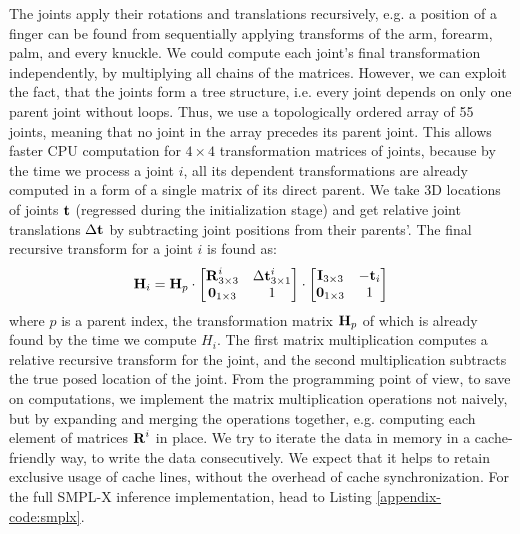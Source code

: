 The joints apply their rotations and translations recursively, e.g. a position of a finger can be found from sequentially applying transforms of the arm, forearm, palm, and every knuckle. We could compute each joint's final transformation independently, by multiplying all chains of the matrices. However, we can exploit the fact, that the joints form a tree structure, i.e. every joint depends on only one parent joint without loops. Thus, we use a topologically ordered array of 55 joints, meaning that no joint in the array precedes its parent joint. This allows faster CPU computation for $4\times4$ transformation matrices of joints, because by the time we process a joint $i$, all its dependent transformations are already computed in a form of a single matrix of its direct parent. We take 3D locations of joints $\bm{\mathrm{t}}$ (regressed during the initialization stage) and get relative joint translations $\Delta\bm{\mathrm{t}}$ by subtracting joint positions from their parents'. The final recursive transform  for a joint $i$ is found as:
\begin{equation}
	\bm{\mathrm{H}}_i = 
	\bm{\mathrm{H}}_p
	\cdot
	\begin{bmatrix} 
		\bm{\mathrm{R}}^i_{3 \times 3} & \Delta\bm{\mathrm{t}}^i_{3 \times 1} \\
		\bm{\mathrm{0}}_{1 \times 3} & 1 \\
	\end{bmatrix}
	\cdot
	\begin{bmatrix} 
		\bm{\mathrm{I}}_{3\times3} & -\bm{\mathrm{t}}_i \\
		\bm{\mathrm{0}}_{1 \times 3} & 1 \\
	\end{bmatrix}
	\label{methods:eq:smplx-rodrigures-4by4}
\end{equation}
where $p$ is a parent index, the transformation matrix $\bm{\mathrm{H}}_p$ of which is already found by the time we compute $H_i$. The first matrix multiplication computes a relative recursive transform for the joint, and the second multiplication subtracts the true posed location of the joint. From the programming point of view, to save on computations, we implement the matrix multiplication operations not naively, but by expanding and merging the operations together, e.g. computing each element of matrices $\bm{\mathrm{R}}^i$ in place. We try to iterate the data in memory in a cache-friendly way, to write the data consecutively. We expect that it helps to retain exclusive usage of cache lines, without the overhead of cache synchronization. For the full SMPL-X inference implementation, head to Listing \ref{appendix-code:smplx}.

